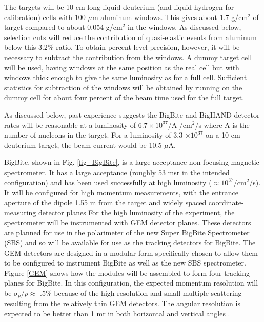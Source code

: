 \documentclass[12pt,letterpaper,oneside]{article}
\begin{document}
The targets will be 10 cm long liquid deuterium (and liquid hydrogen
for calibration) cells with 100 $\mu$m aluminum windows.   This
gives about 1.7 g/cm$^2$ of target compared to about 0.054 g/cm$^2$ in
the windows.  As discussed below, selection cuts will reduce the
contribution of quasi-elastic events from aluminum below this 3.2\% ratio.
To obtain percent-level precision, however, it will be necessary to
subtract the contribution from the windows.  A dummy target cell will
be used, having windows at the same position as the real cell but with
windows thick enough to give the same luminosity as for a full cell.
Sufficient statistics for subtraction of the windows will be obtained
by running on the dummy cell for about four percent of the beam time
used for the full target.

As discussed below, past experience suggests the BigBite and 
BigHAND detector rates will
be reasonable  at a luminosity of $6.7\times10^{37}$/A /cm$^2$/s
where A is the number of nucleons in the target.  For a luminosity of
3.3 $\times 10^{37}$ on a 10 cm deuterium target, the beam current
would be 10.5 $\mu$A.

BigBite, shown in Fig. \ref{fig_BigBite}, is a large acceptance non-focusing
magnetic spectrometer.  It has a large 
acceptance (roughly 53 msr in the
intended configuration) and has been used successfully at high
luminosity ($\approx 10^{37}$/cm$^2$/s).  It will be configured for
high momentum measurements, with the entrance aperture of the 
dipole 1.55 m from the target and
widely spaced coordinate-measuring detector  planes %
For the high luminosity of the experiment, the spectrometer will be
instrumented with GEM detector planes.  These detectors are planned
for use in the polarimeter of the new Super BigBite Spectrometer (SBS) and so
will be available for use as the tracking detectors for BigBite.
The GEM detectors are designed in a modular form specifically chosen
to allow them to be configured to instrument BigBite as well as the
new SBS spectrometer.  Figure \ref{GEM} shows how the modules will be
assembled to form four tracking planes for BigBite.
 In this configuration,
the expected momentum resolution will be $\sigma_p/p\approx$ 
.5\% because of the high resolution and small
multiple-scattering resulting from the relatively thin GEM detectors.
The angular resolution is
expected to be better than 1 mr in both horizontal and vertical angles 
\cite{bb_simulation}.
\end{document}
